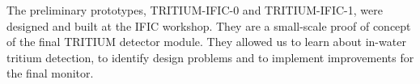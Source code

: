 The preliminary prototypes, TRITIUM-IFIC-0 and TRITIUM-IFIC-1, were designed and built at the IFIC workshop. They are a small-scale proof of concept of the final TRITIUM detector module. They allowed us to learn about in-water tritium detection, to identify design problems and to implement improvements for the final monitor.